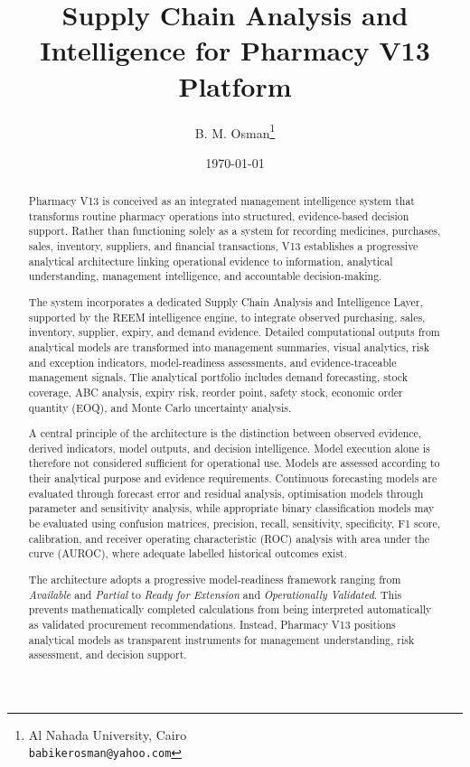 \documentclass[12pt]{article}
\title{\textcolor{titleColor}{\textbf{\Huge Supply Chain Analysis and Intelligence for Pharmacy V13 Platform }}}
\author{B. M. Osman\thanks{Al Nahada University, Cairo \\ \texttt{babikerosman@yahoo.com}}}
\date{\today}
\begin{document}
\maketitle
\begin{abstract}

Pharmacy V13 is conceived as an integrated management intelligence system that
transforms routine pharmacy operations into structured, evidence-based
decision support. Rather than functioning solely as a system for recording
medicines, purchases, sales, inventory, suppliers, and financial transactions,
V13 establishes a progressive analytical architecture linking operational
evidence to information, analytical understanding, management intelligence,
and accountable decision-making.

The system incorporates a dedicated Supply Chain Analysis and Intelligence
Layer, supported by the REEM intelligence engine, to integrate observed
purchasing, sales, inventory, supplier, expiry, and demand evidence. Detailed
computational outputs from analytical models are transformed into management
summaries, visual analytics, risk and exception indicators, model-readiness
assessments, and evidence-traceable management signals. The analytical
portfolio includes demand forecasting, stock coverage, ABC analysis, expiry
risk, reorder point, safety stock, economic order quantity (EOQ), and Monte
Carlo uncertainty analysis.

A central principle of the architecture is the distinction between observed
evidence, derived indicators, model outputs, and decision intelligence. Model
execution alone is therefore not considered sufficient for operational use.
Models are assessed according to their analytical purpose and evidence
requirements. Continuous forecasting models are evaluated through forecast
error and residual analysis, optimisation models through parameter and
sensitivity analysis, while appropriate binary classification models may be
evaluated using confusion matrices, precision, recall, sensitivity,
specificity, F1 score, calibration, and receiver operating characteristic
(ROC) analysis with area under the curve (AUROC), where adequate labelled
historical outcomes exist.

The architecture adopts a progressive model-readiness framework ranging from
\textit{Available} and \textit{Partial} to \textit{Ready for Extension} and
\textit{Operationally Validated}. This prevents mathematically completed
calculations from being interpreted automatically as validated procurement
recommendations. Instead, Pharmacy V13 positions analytical models as
transparent instruments for management understanding, risk assessment, and
decision support.


\end{abstract}
\end{document}
